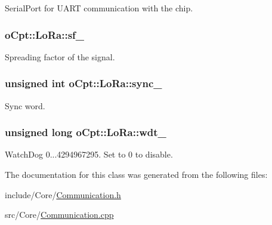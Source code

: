 Serial\+Port for U\+A\+RT communication with the chip. 

\subsubsection[{\texorpdfstring{sf\+\_\+}{sf_}}]{ o\+Cpt\+::\+Lo\+Ra\+::sf\+\_\+\hspace{0.3cm}{\ttfamily [protected]}}\hypertarget{classo_cpt_1_1_lo_ra_acebd51c3b66932357035150f21e88d38}{}\label{classo_cpt_1_1_lo_ra_acebd51c3b66932357035150f21e88d38}


Spreading factor of the signal. 

\subsubsection[{\texorpdfstring{sync\+\_\+}{sync_}}]{\setlength{\rightskip}{0pt plus 5cm}unsigned int o\+Cpt\+::\+Lo\+Ra\+::sync\+\_\+\hspace{0.3cm}{\ttfamily [protected]}}\hypertarget{classo_cpt_1_1_lo_ra_a42f093f868ce1b8d4525031569b77c19}{}\label{classo_cpt_1_1_lo_ra_a42f093f868ce1b8d4525031569b77c19}


Sync word. 

\subsubsection[{\texorpdfstring{wdt\+\_\+}{wdt_}}]{\setlength{\rightskip}{0pt plus 5cm}unsigned long o\+Cpt\+::\+Lo\+Ra\+::wdt\+\_\+\hspace{0.3cm}{\ttfamily [protected]}}\hypertarget{classo_cpt_1_1_lo_ra_aef791d801da3a184f574bb5dcf465bd3}{}\label{classo_cpt_1_1_lo_ra_aef791d801da3a184f574bb5dcf465bd3}


Watch\+Dog 0...4294967295. Set to 0 to disable. 



The documentation for this class was generated from the following files\+:\begin{DoxyCompactItemize}
\item 
include/\+Core/\hyperlink{_communication_8h}{Communication.\+h}\item 
src/\+Core/\hyperlink{_communication_8cpp}{Communication.\+cpp}\end{DoxyCompactItemize}
